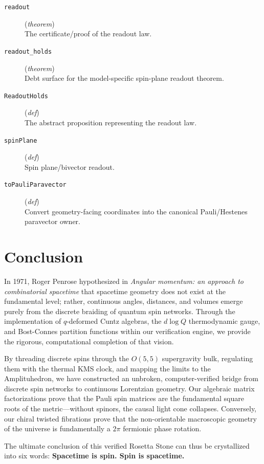 \documentclass[11pt,a4paper]{article}
\begin{document}
\begin{description}
  \item[\texttt{readout}] (\textit{theorem}) \\ The certificate/proof of the readout law.
  \item[\texttt{readout\_holds}] (\textit{theorem}) \\ Debt surface for the model-specific spin-plane readout theorem.
  \item[\texttt{ReadoutHolds}] (\textit{def}) \\ The abstract proposition representing the readout law.
  \item[\texttt{spinPlane}] (\textit{def}) \\ Spin plane/bivector readout.
  \item[\texttt{toPauliParavector}] (\textit{def}) \\ Convert geometry-facing coordinates into the canonical Pauli/Hestenes 
paravector owner.
\end{description}

\section{Conclusion}

In 1971, Roger Penrose hypothesized in \textit{Angular momentum: an approach to combinatorial spacetime} that spacetime geometry does not exist at the fundamental level; rather, continuous angles, distances, and volumes emerge purely from the discrete braiding of quantum spin networks. Through the implementation of $q$-deformed Cuntz algebras, the $d\log Q$ thermodynamic gauge, and Bost-Connes partition functions within our verification engine, we provide the rigorous, computational completion of that vision.

By threading discrete spins through the $O(5,5)$ supergravity bulk, regulating them with the thermal KMS clock, and mapping the limits to the Amplituhedron, we have constructed an unbroken, computer-verified bridge from discrete spin networks to continuous Lorentzian geometry. Our algebraic matrix factorizations prove that the Pauli spin matrices are the fundamental square roots of the metric---without spinors, the causal light cone collapses. Conversely, our chiral twisted fibrations prove that the non-orientable macroscopic geometry of the universe is fundamentally a $2\pi$ fermionic phase rotation.

The ultimate conclusion of this verified Rosetta Stone can thus be crystallized into six words: \textbf{Spacetime is spin. Spin is spacetime.}
\end{document}
